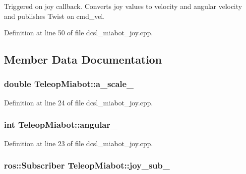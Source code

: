 \-Triggered on joy callback. \-Converts joy values to velocity and angular velocity and publishes \-Twist on cmd\-\_\-vel. 



\-Definition at line 50 of file dcsl\-\_\-miabot\-\_\-joy.\-cpp.



\subsection{\-Member \-Data \-Documentation}
\subsubsection[{a\-\_\-scale\-\_\-}]{\setlength{\rightskip}{0pt plus 5cm}double {\bf \-Teleop\-Miabot\-::a\-\_\-scale\-\_\-}\hspace{0.3cm}{\ttfamily  [private]}}\label{classTeleopMiabot_a1fb244f8b0194a89c95410472c3cfcd8}


\-Definition at line 24 of file dcsl\-\_\-miabot\-\_\-joy.\-cpp.

\subsubsection[{angular\-\_\-}]{\setlength{\rightskip}{0pt plus 5cm}int {\bf \-Teleop\-Miabot\-::angular\-\_\-}\hspace{0.3cm}{\ttfamily  [private]}}\label{classTeleopMiabot_a91ecc1e3007d3675b1ff7a5047b1a53d}


\-Definition at line 23 of file dcsl\-\_\-miabot\-\_\-joy.\-cpp.

\subsubsection[{joy\-\_\-sub\-\_\-}]{\setlength{\rightskip}{0pt plus 5cm}ros\-::\-Subscriber {\bf \-Teleop\-Miabot\-::joy\-\_\-sub\-\_\-}\hspace{0.3cm}{\ttfamily  [private]}}\label{classTeleopMiabot_ab94f106a0adc2381ebfdebb428682457}


